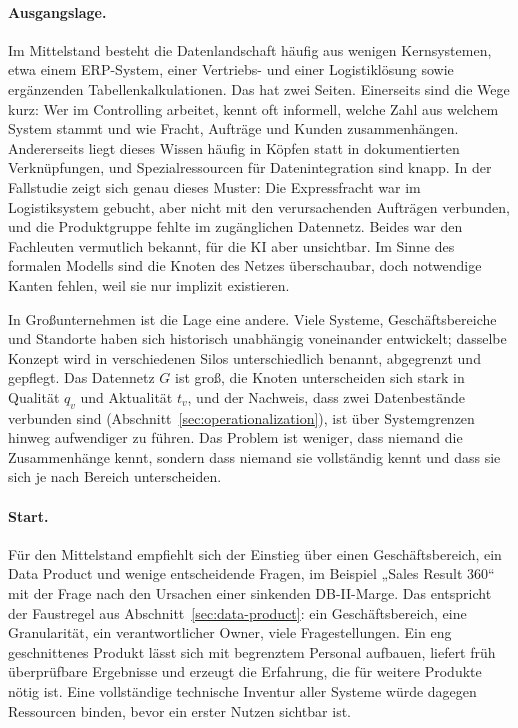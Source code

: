 \documentclass[a4paper,12pt]{article}
\theoremstyle{definition}
\begin{document}
\paragraph{Ausgangslage.}
Im Mittelstand besteht die Datenlandschaft häufig aus wenigen Kernsystemen, etwa einem ERP-System, einer Vertriebs- und einer Logistiklösung sowie ergänzenden Tabellenkalkulationen. Das hat zwei Seiten. Einerseits sind die Wege kurz: Wer im Controlling arbeitet, kennt oft informell, welche Zahl aus welchem System stammt und wie Fracht, Aufträge und Kunden zusammenhängen. Andererseits liegt dieses Wissen häufig in Köpfen statt in dokumentierten Verknüpfungen, und Spezialressourcen für Datenintegration sind knapp. In der Fallstudie zeigt sich genau dieses Muster: Die Expressfracht war im Logistiksystem gebucht, aber nicht mit den verursachenden Aufträgen verbunden, und die Produktgruppe fehlte im zugänglichen Datennetz. Beides war den Fachleuten vermutlich bekannt, für die KI aber unsichtbar. Im Sinne des formalen Modells sind die Knoten des Netzes überschaubar, doch notwendige Kanten fehlen, weil sie nur implizit existieren.

In Großunternehmen ist die Lage eine andere. Viele Systeme, Geschäftsbereiche und Standorte haben sich historisch unabhängig voneinander entwickelt; dasselbe Konzept wird in verschiedenen Silos unterschiedlich benannt, abgegrenzt und gepflegt. Das Datennetz $G$ ist groß, die Knoten unterscheiden sich stark in Qualität $q_v$ und Aktualität $t_v$, und der Nachweis, dass zwei Datenbestände verbunden sind (Abschnitt~\ref{sec:operationalization}), ist über Systemgrenzen hinweg aufwendiger zu führen. Das Problem ist weniger, dass niemand die Zusammenhänge kennt, sondern dass niemand sie vollständig kennt und dass sie sich je nach Bereich unterscheiden.

\paragraph{Start.}
Für den Mittelstand empfiehlt sich der Einstieg über einen Geschäftsbereich, ein Data Product und wenige entscheidende Fragen, im Beispiel „Sales Result 360“ mit der Frage nach den Ursachen einer sinkenden DB-II-Marge. Das entspricht der Faustregel aus Abschnitt~\ref{sec:data-product}: ein Geschäftsbereich, eine Granularität, ein verantwortlicher Owner, viele Fragestellungen. Ein eng geschnittenes Produkt lässt sich mit begrenztem Personal aufbauen, liefert früh überprüfbare Ergebnisse und erzeugt die Erfahrung, die für weitere Produkte nötig ist. Eine vollständige technische Inventur aller Systeme würde dagegen Ressourcen binden, bevor ein erster Nutzen sichtbar ist.
\end{document}
